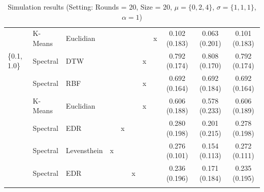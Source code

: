 \documentclass[12pt,a4paper,bibliography=totocnumbered,listof=totocnumbered]{scrartcl}
\begin{document}
\begin{appendix}
\begin{table}[!htbp]
\begin{tabularx}{\textwidth}{ lllcccccccc}
		& K-Means & Euclidian  &  &  &  &  & x & 0.102 (0.183) & 0.063 (0.201) & 0.101 (0.183) \\ 
		\{0.1, 1.0\} & Spectral  & DTW &  &  &  & x &  & 0.792 (0.174) & 0.808 (0.170) & 0.792 (0.174) \\ 
		& Spectral  & RBF &  &  &  & x &  & 0.692 (0.164) & 0.692 (0.184) & 0.692 (0.164) \\ 
		& K-Means & Euclidian  &  &  &  & x &  & 0.606 (0.188) & 0.578 (0.233) & 0.606 (0.189) \\ 
		& Spectral  & EDR &  & x &  &  &  & 0.280 (0.198) & 0.201 (0.215) & 0.278 (0.198) \\ 
		& Spectral  & Levensthein & x &  &  &  &  & 0.276 (0.101) & 0.154 (0.113) & 0.272 (0.111) \\ 
		& Spectral  & EDR &  &  & x &  &  & 0.236 (0.196) & 0.171 (0.184) & 0.235 (0.195) \\ 
		\hline \\[-1.8ex] 
	\end{tabularx} 
	\caption{Simulation results (Setting: Rounds = 20, Size = 20, $\mu = \{0,2,4\}$, $\sigma =  \{1,1,1\}$, $\alpha = 1$)} 
\end{table} 




\end{appendix}
\end{document}
